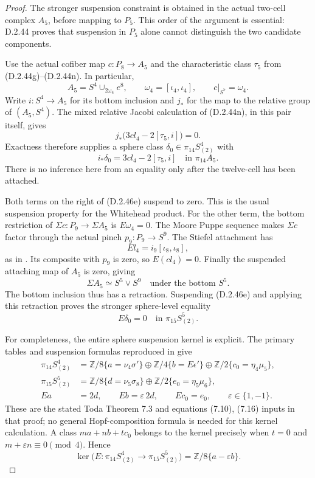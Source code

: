 \begin{proof}
The stronger suspension constraint is obtained in the actual
two-cell complex $A_5$, before mapping to $P_5$.  This order of
the argument is essential: D.2.44 proves that suspension in
$P_5$ alone cannot distinguish the two candidate components.

Use the actual cofiber map $c:P_8\to A_5$ and the characteristic
class $\tau_5$ from (D.2.44g)--(D.2.44n).  In particular,
\[
 A_5=S^4\cup_{2\omega_4}e^8,
 \qquad \omega_4=[\iota_4,\iota_4],
 \qquad c|_{S^7}=\omega_4.
 \tag{D.2.46d}
\]
Write $i:S^4\to A_5$ for its bottom inclusion and $j_*$ for
the map to the relative group of $(A_5,S^4)$.  The mixed relative
Jacobi calculation of (D.2.44n), in this pair itself, gives
\[
 j_*\bigl(3cl_4-2[\tau_5,i]\bigr)=0.
\]
Exactness therefore supplies a sphere class
$\delta_0\in\pi_{14}S^4_{(2)}$ with
\[
             i_*\delta_0=3cl_4-2[\tau_5,i]
                       \quad\text{in }\pi_{14}A_5.
 \tag{D.2.46e}
\]
There is no inference here from an equality only after the
twelve-cell has been attached.

Both terms on the right of (D.2.46e) suspend to zero.  This is
the usual suspension property for the Whitehead product.  For
the other term, the bottom restriction of
$\Sigma c:P_9\to\Sigma A_5$ is $E\omega_4=0$.
The Moore Puppe sequence makes $\Sigma c$ factor through the
actual pinch $p_9:P_9\to S^9$.  The Stiefel attachment has
\[
                 El_4=i_9[\iota_8,\iota_8],
 \tag{D.2.46f}
\]
as in \cite[Lemmas 2.7--2.8, p.~523]{EH5MorisugiMukai2000}.
Its composite with $p_9$ is zero, so $E(cl_4)=0$.
Finally the suspended attaching map of $A_5$ is zero, giving
\[
          \Sigma A_5\simeq S^5\vee S^9
          \quad\text{under the bottom }S^5.
\]
The bottom inclusion thus has a retraction.  Suspending
(D.2.46e) and applying this retraction proves the stronger
sphere-level equality
\[
                 E\delta_0=0\quad\text{in }\pi_{15}S^5_{(2)}.
 \tag{D.2.46g}
\]

For completeness, the entire sphere suspension kernel is explicit.
The primary tables and suspension formulas reproduced in
\cite[Proposition 7 and its proof, p.~7]{FGHStricklandToda}
give
\[
\begin{aligned}
 \pi_{14}S^4_{(2)}
  &=\mathbb Z/8\{a=\nu_4\sigma'\}
    \oplus\mathbb Z/4\{b=E\epsilon'\}
    \oplus\mathbb Z/2\{c_0=\eta_4\mu_5\},\\
 \pi_{15}S^5_{(2)}
  &=\mathbb Z/8\{d=\nu_5\sigma_8\}
    \oplus\mathbb Z/2\{e_0=\eta_5\mu_6\},\\
 Ea&=2d,\qquad Eb=\varepsilon\,2d,\qquad Ec_0=e_0,
 \qquad \varepsilon\in\{1,-1\}.
\end{aligned}
 \tag{D.2.46h}
\]
These are the stated Toda Theorem 7.3 and equations (7.10),
(7.16) inputs in that proof; no general Hopf-composition formula
is needed for this kernel calculation.  A class $ma+nb+tc_0$
belongs to the kernel precisely when $t=0$ and
$m+\varepsilon n\equiv0\pmod4$.  Hence
\[
 \ker\bigl(E:\pi_{14}S^4_{(2)}\to\pi_{15}S^5_{(2)}\bigr)
       =\mathbb Z/8\{a-\varepsilon b\}.
 \tag{D.2.46i}
\]


\end{proof}
